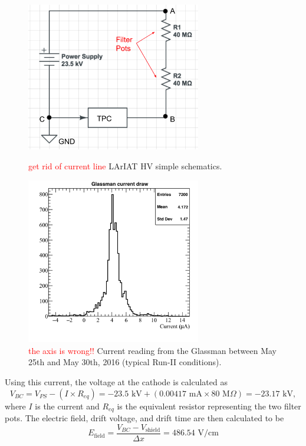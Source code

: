 \begin{figure}[h]
\centering
\begin{minipage}{0.45\textwidth}
\centering
\includegraphics[width=3in]{AppendixB-EField/Images/CircuitLArIAT.png}
\caption{\textcolor{red}{get rid of current line} LArIAT HV simple schematics.}
\label{fig:circuit}
\end{minipage}\hfill
\begin{minipage}{0.45\textwidth}
\centering
\includegraphics[width=3in]{AppendixB-EField/Images/glassman_current_20160525-30.png}
\caption{\textcolor{red}{the axis is wrong!!} Current reading from the Glassman between May 25th and May 30th, 2016 (typical Run-II conditions).}
\label{fig:currentMeasurement}
\end{minipage}
\end{figure}

Using this current, the voltage at the cathode is calculated as
\begin{equation} \label{eq:VBC}
V_{BC}=V_{PS} - (I \times R_{eq}) = -23.5\text{ kV} + ( 0.00417\text{ mA} \times 80\text{ M}\Omega ) = -23.17\text{ kV}, 
\end{equation}
where $I$ is the current and $R_{eq}$ is the equivalent resistor representing the two filter pots. The electric field, drift voltage, and drift time are then calculated to be
\begin{equation}E_{\text{field}} = \frac{V_{BC} - V_{\text{shield}}}{\Delta x} = 486.54\text{ V/cm}
\end{equation}



